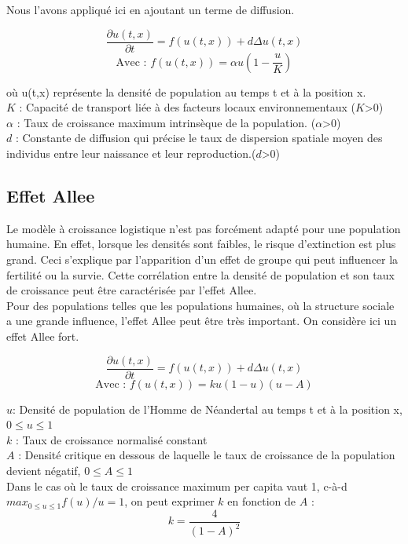 \documentclass[a4paper,11pt]{article}
\begin{document}
Nous l'avons appliqué ici en ajoutant un terme de diffusion.

$$\frac{\partial u(t,x)}{\partial t}=f(u(t,x))+d\Delta u(t,x)$$
$$\text{Avec : }f(u(t,x))=\alpha u (1 - \dfrac{u}{K}) $$

\noindent où u(t,x) représente la densité de population au temps t et à la position x.\\

\noindent $K$ : Capacité de transport liée à des facteurs locaux environnementaux ($K$>0) \\
$\alpha$ : Taux de croissance maximum intrinsèque de la population. ($\alpha$>0)\\
$d$ : Constante de diffusion qui précise le taux de dispersion spatiale moyen des individus entre leur naissance et leur reproduction.($d$>0)

\subsection{Effet Allee}
Le modèle à croissance logistique n'est pas forcément adapté pour une population humaine. En effet, lorsque les densités sont faibles, le risque d'extinction est plus grand. Ceci s'explique par l'apparition d'un effet de groupe qui peut influencer la fertilité ou la survie. Cette corrélation entre la densité de population et son taux de croissance peut être caractérisée par l'effet Allee.\\
Pour des populations telles que les populations humaines, où la structure sociale a une grande influence, l'effet Allee peut être très important. On considère ici un effet Allee fort.

$$\frac{\partial u(t,x)}{\partial t}=f(u(t,x))+d\Delta u(t,x)$$
$$\text{Avec : }f(u(t,x))=ku(1-u)(u-A)$$

\noindent $u$: Densité de population de l'Homme de Néandertal au temps t et à la position x,  $0\le u \le 1$\\
$k$ : Taux de croissance normalisé constant \\
$A$ : Densité critique en dessous de laquelle le taux de croissance de la population devient négatif, $0\le A \le 1$
\vspace{0.5cm}\\
Dans le cas où le taux de croissance maximum per capita vaut 1, c-à-d $max_{0\le u \le 1} f(u)/u=1$, on peut exprimer $k$ en fonction de $A$ : 
\begin{equation}
k=\frac{4}{(1-A)^2}
\label{Eqk}
\end{equation}
\end{document}
